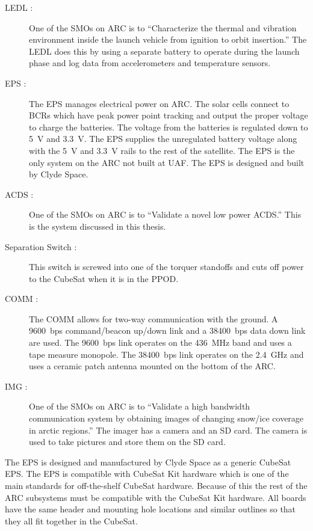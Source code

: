 \begin{description}
    \item[\acs{LEDL} :] One of the \acp{SMO} on \ac{ARC} is to \enquote{Characterize the thermal and vibration environment inside the launch vehicle from ignition to orbit insertion.}\cite{ARCweb} The \ac{LEDL} does this by using a separate battery to operate during the launch phase and log data from accelerometers and temperature sensors.
    \item[\acs{EPS} :] The \ac{EPS} manages electrical power on \ac{ARC}. The solar cells connect to \acp{BCR} which have peak power point tracking and output the proper voltage to charge the batteries. The voltage from the batteries is regulated down to 5~V and 3.3~V. The \ac{EPS} supplies the unregulated battery voltage along with the 5~V and 3.3~V rails to the rest of the satellite. The \ac{EPS} is the only system on the \ac{ARC} not built at UAF. The \ac{EPS} is designed and built by Clyde Space.
    \item[\acs{ACDS} :] One of the \acp{SMO} on \ac{ARC} is to \enquote{Validate a novel low power \acf{ACDS}.} \cite{ARCweb} This is the system discussed in this thesis.
    \item[Separation Switch :] This switch is screwed into one of the torquer standoffs and cuts off power to the CubeSat when it is in the \ac{PPOD}.
    \item[\acs{COMM} :] The \ac{COMM} allows for two-way communication with the ground. A 9600~bps command/beacon up/down link and a 38400~bps data down link are used. The 9600~bps link operates on the 436~MHz band and uses a tape measure monopole. The 38400~bps link operates on the 2.4~GHz and uses a ceramic patch antenna mounted on the bottom of the \ac{ARC}.
    \item[\acs{IMG} :] One of the \acp{SMO} on \ac{ARC} is to \enquote{Validate a high bandwidth communication system by obtaining images of changing snow/ice coverage in arctic regions.}\cite{ARCweb} The imager has a camera and an SD card. The camera is used to take pictures and store them on the SD card.
\end{description}

The \ac{EPS} is designed and manufactured by Clyde Space as a generic CubeSat \ac{EPS}. The \ac{EPS} is compatible with CubeSat Kit\cite{CSK} hardware which is one of the main standards for off-the-shelf CubeSat hardware. Because of this the rest of the \ac{ARC} subsystems must be compatible with the CubeSat Kit hardware. All boards have the same header and mounting hole locations and similar outlines so that they all fit together in the CubeSat.


